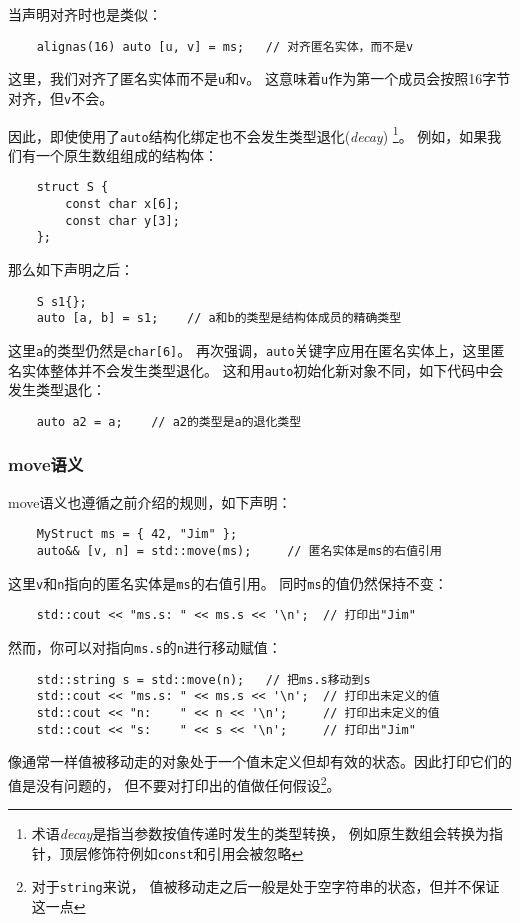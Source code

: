 当声明对齐时也是类似：
\begin{lstlisting}
    alignas(16) auto [u, v] = ms;   // 对齐匿名实体，而不是v
\end{lstlisting}
这里，我们对齐了匿名实体而不是\texttt{u}和\texttt{v}。
这意味着\texttt{u}作为第一个成员会按照16字节对齐，但\texttt{v}不会。

因此，即使使用了\texttt{auto}结构化绑定也不会发生类型退化(\emph{decay})
\footnote{术语\emph{decay}是指当参数按值传递时发生的类型转换，
例如原生数组会转换为指针，顶层修饰符例如\texttt{const}和引用会被忽略}。
例如，如果我们有一个原生数组组成的结构体：
\begin{lstlisting}
    struct S {
        const char x[6];
        const char y[3];
    };
\end{lstlisting}
那么如下声明之后：
\begin{lstlisting}
    S s1{};
    auto [a, b] = s1;    // a和b的类型是结构体成员的精确类型
\end{lstlisting}
这里\texttt{a}的类型仍然是\texttt{char[6]}。
再次强调，\texttt{auto}关键字应用在匿名实体上，这里匿名实体整体并不会发生类型退化。
这和用\texttt{auto}初始化新对象不同，如下代码中会发生类型退化：
\begin{lstlisting}
    auto a2 = a;    // a2的类型是a的退化类型
\end{lstlisting}

\subsubsection*{move语义}
move语义也遵循之前介绍的规则，如下声明：
\begin{lstlisting}
    MyStruct ms = { 42, "Jim" };
    auto&& [v, n] = std::move(ms);     // 匿名实体是ms的右值引用
\end{lstlisting}
这里\texttt{v}和\texttt{n}指向的匿名实体是\texttt{ms}的右值引用。
同时\texttt{ms}的值仍然保持不变：
\begin{lstlisting}
    std::cout << "ms.s: " << ms.s << '\n';  // 打印出"Jim"
\end{lstlisting}
然而，你可以对指向\texttt{ms.s}的\texttt{n}进行移动赋值：
\begin{lstlisting}
    std::string s = std::move(n);   // 把ms.s移动到s
    std::cout << "ms.s: " << ms.s << '\n';  // 打印出未定义的值
    std::cout << "n:    " << n << '\n';     // 打印出未定义的值
    std::cout << "s:    " << s << '\n';     // 打印出"Jim"
\end{lstlisting}
像通常一样值被移动走的对象处于一个值未定义但却有效的状态。因此打印它们的值是没有问题的，
但不要对打印出的值做任何假设\footnote{对于\texttt{string}来说，
值被移动走之后一般是处于空字符串的状态，但并不保证这一点}。

